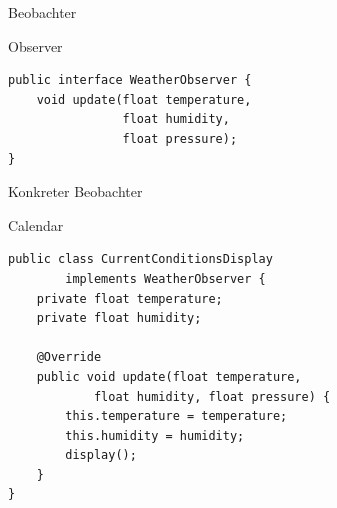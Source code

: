 \begin{frame}[fragile]{Beobachter}
	\begin{exampleblock}{Observer}
 		\begin{lstlisting}
public interface WeatherObserver {
    void update(float temperature, 
                float humidity, 
                float pressure);
}
 		\end{lstlisting}
 	\end{exampleblock}
\end{frame}

\begin{frame}[fragile]{Konkreter Beobachter}
	\begin{exampleblock}{Calendar}
 		\begin{lstlisting}
public class CurrentConditionsDisplay 
        implements WeatherObserver {
    private float temperature;
    private float humidity;

    @Override
    public void update(float temperature, 
            float humidity, float pressure) {
        this.temperature = temperature;
        this.humidity = humidity;
        display();
    }
}	    
 		\end{lstlisting}
 	\end{exampleblock}
\end{frame}